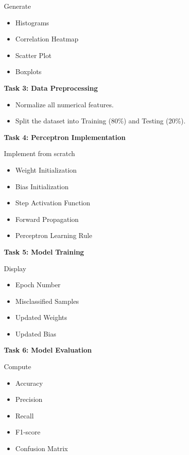 \documentclass[11pt]{article}
\begin{document}
Generate

\begin{itemize}
\item Histograms
\item Correlation Heatmap
\item Scatter Plot
\item Boxplots
\end{itemize}

\vspace{2mm}

\textbf{Task 3: Data Preprocessing}

\begin{itemize}
\item Normalize all numerical features.
\item Split the dataset into Training (80\%) and Testing (20\%).
\end{itemize}

\vspace{2mm}

\textbf{Task 4: Perceptron Implementation}

Implement from scratch

\begin{itemize}
\item Weight Initialization
\item Bias Initialization
\item Step Activation Function
\item Forward Propagation
\item Perceptron Learning Rule
\end{itemize}

\vspace{2mm}

\textbf{Task 5: Model Training}

Display

\begin{itemize}
\item Epoch Number
\item Misclassified Samples
\item Updated Weights
\item Updated Bias
\end{itemize}

\vspace{2mm}

\textbf{Task 6: Model Evaluation}

Compute

\begin{itemize}
\item Accuracy
\item Precision
\item Recall
\item F1-score
\item Confusion Matrix
\end{itemize}
\end{document}
